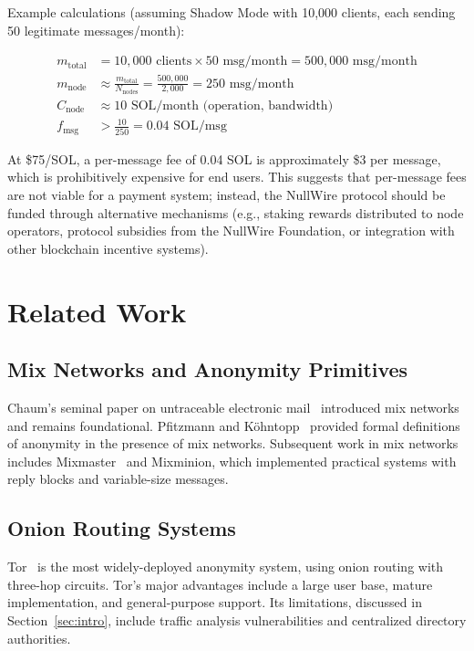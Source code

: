 \documentclass[11pt]{article}
\theoremstyle{definition}
\theoremstyle{remark}
\begin{document}
Example calculations (assuming Shadow Mode with 10,000 clients, each sending 50 legitimate messages/month):

\begin{align}
m_{\text{total}} &= 10,000 \text{ clients} \times 50 \text{ msg/month} = 500,000 \text{ msg/month} \label{eq:total-msgs}\\
m_{\text{node}} &\approx \frac{m_{\text{total}}}{N_{\text{nodes}}} = \frac{500,000}{2,000} = 250 \text{ msg/month} \label{eq:per-node-msgs}\\
C_{\text{node}} &\approx 10 \text{ SOL/month (operation, bandwidth)} \label{eq:node-cost}\\
f_{\text{msg}} &> \frac{10}{250} = 0.04 \text{ SOL/msg} \label{eq:min-fee}
\end{align}

At \$75/SOL, a per-message fee of 0.04 SOL is approximately \$3 per message, which is prohibitively expensive for end users. This suggests that per-message fees are not viable for a payment system; instead, the NullWire protocol should be funded through alternative mechanisms (e.g., staking rewards distributed to node operators, protocol subsidies from the NullWire Foundation, or integration with other blockchain incentive systems).

\section{Related Work}
\label{sec:related}

\subsection{Mix Networks and Anonymity Primitives}

Chaum's seminal paper on untraceable electronic mail~\cite{chaum1981} introduced mix networks and remains foundational. Pfitzmann and K\"ohntopp~\cite{pfitzmann1999} provided formal definitions of anonymity in the presence of mix networks. Subsequent work in mix networks includes Mixmaster~\cite{mixmaster2003} and Mixminion, which implemented practical systems with reply blocks and variable-size messages.

\subsection{Onion Routing Systems}

Tor~\cite{tor2004} is the most widely-deployed anonymity system, using onion routing with three-hop circuits. Tor's major advantages include a large user base, mature implementation, and general-purpose support. Its limitations, discussed in Section~\ref{sec:intro}, include traffic analysis vulnerabilities and centralized directory authorities.
\end{document}
